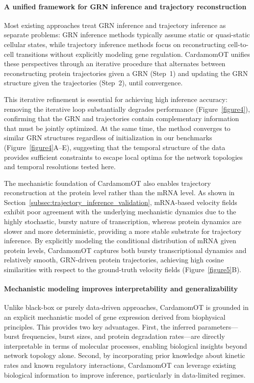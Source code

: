 \documentclass[a4paper, 11pt]{article}
\theoremstyle{plain}
\theoremstyle{remark}
\begin{document}
\paragraph{A unified framework for GRN inference and trajectory reconstruction}
Most existing approaches treat GRN inference and trajectory inference as separate problems: GRN inference methods typically assume static or quasi-static cellular states, while trajectory inference methods focus on reconstructing cell-to-cell transitions without explicitly modeling gene regulation. CardamomOT unifies these perspectives through an iterative procedure that alternates between reconstructing protein trajectories given a GRN (Step~1) and updating the GRN structure given the trajectories (Step~2), until convergence.

This iterative refinement is essential for achieving high inference accuracy: removing the iterative loop substantially degrades performance (Figure~\ref{figure4}), confirming that the GRN and trajectories contain complementary information that must be jointly optimized. At the same time, the method converges to similar GRN structures regardless of initialization in our benchmarks (Figure~\ref{figure4}A--E), suggesting that the temporal structure of the data provides sufficient constraints to escape local optima for the network topologies and temporal resolutions tested here.

The mechanistic foundation of CardamomOT also enables trajectory reconstruction at the protein level rather than the mRNA level. As shown in Section~\ref{subsec:trajectory_inference_validation}, mRNA-based velocity fields exhibit poor agreement with the underlying mechanistic dynamics due to the highly stochastic, bursty nature of transcription, whereas protein dynamics are slower and more deterministic, providing a more stable substrate for trajectory inference. By explicitly modeling the conditional distribution of mRNA given protein levels, CardamomOT captures both bursty transcriptional dynamics and relatively smooth, GRN-driven protein trajectories, achieving high cosine similarities with respect to the ground-truth velocity fields (Figure~\ref{figure5}B).

\paragraph{Mechanistic modeling improves interpretability and generalizability}
Unlike black-box or purely data-driven approaches, CardamomOT is grounded in an explicit mechanistic model of gene expression derived from biophysical principles. This provides two key advantages. First, the inferred parameters—burst frequencies, burst sizes, and protein degradation rates—are directly interpretable in terms of molecular processes, enabling biological insights beyond network topology alone. Second, by incorporating prior knowledge about kinetic rates and known regulatory interactions, CardamomOT can leverage existing biological information to improve inference, particularly in data-limited regimes.
\end{document}
